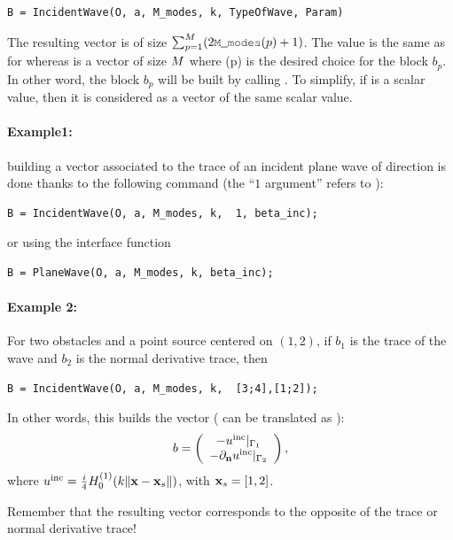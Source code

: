 \subsubsection{}

\begin{lstlisting}
B = IncidentWave(O, a, M_modes, k, TypeOfWave, Param)
\end{lstlisting}
The resulting vector  is of size $\sum_{p=1}^{\Nscat}(2\code{M\_modes}(p)+1)$. The value  is the same as for  whereas  is a vector of size $M$ where (p) is the desired choice for the block $b_p$. In other word, the block $b_p$ will be built by calling . To simplify, if  is a scalar value, then it is considered as a vector of the same scalar value.

\paragraph{Example1:} building a vector associated to the trace of an incident plane wave of direction  is done thanks to the following command (the ``$1$ argument'' refers to ):
\begin{lstlisting}
B = IncidentWave(O, a, M_modes, k,  1, beta_inc);
\end{lstlisting}
or using the interface function
\begin{lstlisting}
B = PlaneWave(O, a, M_modes, k, beta_inc);
\end{lstlisting}
\paragraph{Example 2:} For two obstacles and a point source centered on $(1,2)$, if $b_1$ is the trace of the wave and $b_2$ is the normal derivative trace, then
\begin{lstlisting}
B = IncidentWave(O, a, M_modes, k,  [3;4],[1;2]);
\end{lstlisting}
In other words, this builds the vector (\code{[3,4]} can be translated as ):
$$
b = \left(\begin{array}{c}
-u^{\textrm{inc}}|_{\Gamma_1}\\
-\partial_{\mathbf{n}}u^{\textrm{inc}}|_{\Gamma_2}\\
\end{array}\right),
$$
where $u^{\textrm{inc}} = \frac{i}{4}H_0^{(1)}(k\|{\mathbf{x}}-{\mathbf{x}}_s\|)$, with ${\mathbf{x}}_s = [1,2]$.
\begin{remark}
Remember that the resulting vector corresponds to the opposite of the trace or normal derivative trace!
\end{remark}


